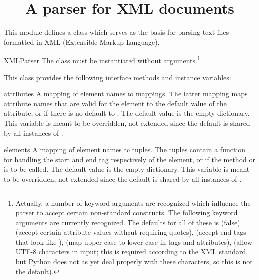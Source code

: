 \section{ ---
         A parser for XML documents}





This module defines a class  which serves as the basis 
for parsing text files formatted in XML (Extensible Markup Language).

\begin{classdesc}{XMLParser}{}
The  class must be instantiated without
arguments.\footnote{Actually, a number of keyword arguments are
recognized which influence the parser to accept certain non-standard
constructs.  The following keyword arguments are currently
recognized.  The defaults for all of these is  (false).
 (accept certain attribute values
without requiring quotes),  (accept
end tags that look like \code{</>}),  (map upper case to
lower case in tags and attributes),  (allow UTF-8
characters in input; this is required according to the XML standard,
but Python does not as yet deal properly with these characters, so
this is not the default).}
\end{classdesc}

This class provides the following interface methods and instance variables:

\begin{memberdesc}{attributes}
A mapping of element names to mappings.  The latter mapping maps
attribute names that are valid for the element to the default value of 
the attribute, or if there is no default to .  The default
value is the empty dictionary.  This variable is meant to be
overridden, not extended since the default is shared by all instances
of .
\end{memberdesc}

\begin{memberdesc}{elements} 
A mapping of element names to tuples.  The tuples contain a function
for handling the start and end tag respectively of the element, or
 if the method  or
 is to be called.  The default value is the
empty dictionary.  This variable is meant to be overridden, not
extended since the default is shared by all instances of
.
\end{memberdesc}

